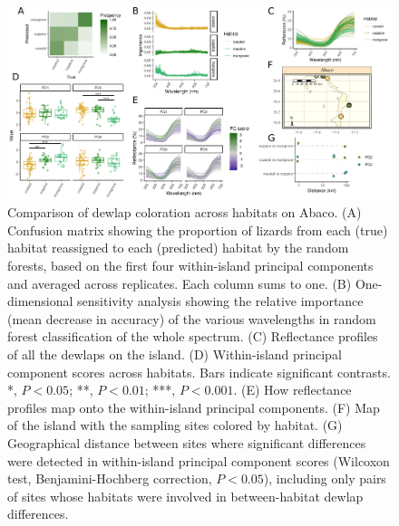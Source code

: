
\begin{figure}[H]
	\centering
	\includegraphics[width=\textwidth]{figures/Abaco.png}
	\caption{Comparison of dewlap coloration across habitats on Abaco. (A) Confusion matrix showing the proportion of lizards from each (true) habitat reassigned to each (predicted) habitat by the random forests, based on the first four within-island principal components and averaged across replicates. Each column sums to one. (B) One-dimensional sensitivity analysis showing the relative importance (mean decrease in accuracy) of the various wavelengths in random forest classification of the whole spectrum. (C) Reflectance profiles of all the dewlaps on the island. (D) Within-island principal component scores across habitats. Bars indicate significant contrasts. *, $P < 0.05$; **, $P < 0.01$; ***, $P < 0.001$. (E) How reflectance profiles map onto the within-island principal components. (F) Map of the island with the sampling sites colored by habitat. (G) Geographical distance between sites where significant differences were detected in within-island principal component scores (Wilcoxon test, Benjamini-Hochberg correction, $P < 0.05$), including only pairs of sites whose habitats were involved in between-habitat dewlap differences.}
	\label{fig:Abaco}
\end{figure}